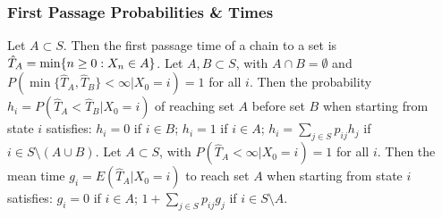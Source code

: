 \subsubsection*{First Passage Probabilities \& Times}
 Let $A \subset S$. Then the first passage time of a chain to a set is $\Hat{T}_A = \min\{n \ge 0: X_n \in A\}$.
 Let $A, B \subset S$, with $A \cap B = \emptyset$ and $P(\min\{\hat{T}_A, \hat{T}_B\} < \infty | X_0 = i) = 1$ for all $i$. Then the probability $h_i = P(\hat{T}_A < \hat{T}_B | X_0 = i)$ of reaching set $A$ before set $B$ when starting from state $i$ satisfies: $h_i = 0$ if $i \in B$; $h_i  = 1$ if $i \in A$; $h_i = \sum_{j \in S} p_{ij}h_j$ if $i \in S \setminus (A \cup B)$.
 Let $A \subset S$, with $P(\hat{T}_A < \infty | X_0 = i) = 1$ for all $i$. Then the mean time $g_i = E(\hat{T}_A | X_0 = i)$ to reach set $A$ when starting from state $i$ satisfies: $g_i = 0$ if $i \in A$; $1 + \sum_{j \in S} p_{ij}g_j$ if $i \in S \setminus A$.